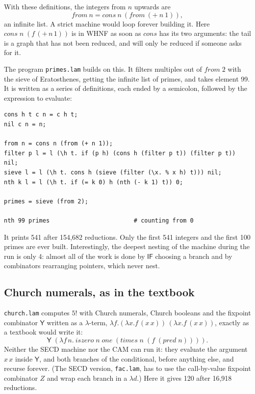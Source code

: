 \documentclass[11pt,a4paper]{article}
\newcommand{\cmb}[1]{\textsf{#1}}
\newcommand{\Y}{\cmb{Y}}
\newcommand{\IF}{\cmb{IF}}
\theoremstyle{definition}
\theoremstyle{plain}
\begin{document}
With these definitions, the integers from $n$ upwards are
\[
  \mathit{from}\ n = \mathit{cons}\ n\ (\mathit{from}\ ({+}\ n\ 1)),
\]
an infinite list. A strict machine would loop forever building it. Here
$\mathit{cons}\;n\;(f\,({+}\,n\,1))$ is in WHNF as soon as $\mathit{cons}$ has
its two arguments: the tail is a graph that has not been reduced, and will
only be reduced if someone asks for it.

The program \texttt{primes.lam} builds on this. It filters multiples out of
$\mathit{from}\;2$ with the sieve of Eratosthenes, getting the infinite list
of primes, and takes element 99. It is written as a series of definitions,
each ended by a semicolon, followed by the expression to evaluate:
\begin{lstlisting}[style=plain]
cons h t c n = c h t;
nil c n = n;

from n = cons n (from (+ n 1));
filter p l = l (\h t. if (p h) (cons h (filter p t)) (filter p t)) nil;
sieve l = l (\h t. cons h (sieve (filter (\x. % x h) t))) nil;
nth k l = l (\h t. if (= k 0) h (nth (- k 1) t)) 0;

primes = sieve (from 2);

nth 99 primes                        # counting from 0
\end{lstlisting}
It prints 541 after 154,682 reductions. Only the first 541 integers and the
first 100 primes are ever built. Interestingly, the deepest nesting of the
machine during the run is only 4: almost all of the work is done by $\IF$
choosing a branch and by combinators rearranging pointers, which never nest.

\subsection{Church numerals, as in the textbook}

\texttt{church.lam} computes $5!$ with Church numerals, Church booleans and
the fixpoint combinator $\Y$ written as a $\lambda$-term,
$\lambda f.(\lambda x.f\,(x\,x))\,(\lambda x.f\,(x\,x))$, exactly as a textbook
would write it:
\[
  \Y\;(\lambda f\,n.\ \mathit{iszero}\;n\;\mathit{one}\;(\mathit{times}\;n\;(f\;(\mathit{pred}\;n)))).
\]
Neither the SECD machine nor the CAM can run it: they evaluate the
argument $x\,x$ inside $\Y$, and both branches of the conditional, before
anything else, and recurse forever. (The SECD version, \texttt{fac.lam},
has to use the call-by-value fixpoint combinator $Z$ and wrap each branch in
a $\lambda d.$) Here it gives 120 after 16,918 reductions.
\end{document}

